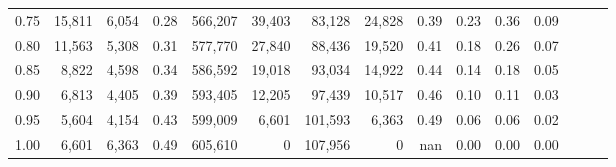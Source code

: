 \begin{tabular}{rrrrrrrrrrrrrrr}
0.75 &  15,811 &  6,054 &  0.28 &  566,207 &   39,403 &   83,128 &   24,828 &  0.39 &  0.23 &  0.36 &      0.09 \\
0.80 &  11,563 &  5,308 &  0.31 &  577,770 &   27,840 &   88,436 &   19,520 &  0.41 &  0.18 &  0.26 &      0.07 \\
0.85 &   8,822 &  4,598 &  0.34 &  586,592 &   19,018 &   93,034 &   14,922 &  0.44 &  0.14 &  0.18 &      0.05 \\
0.90 &   6,813 &  4,405 &  0.39 &  593,405 &   12,205 &   97,439 &   10,517 &  0.46 &  0.10 &  0.11 &      0.03 \\
0.95 &   5,604 &  4,154 &  0.43 &  599,009 &    6,601 &  101,593 &    6,363 &  0.49 &  0.06 &  0.06 &      0.02 \\
1.00 &   6,601 &  6,363 &  0.49 &  605,610 &        0 &  107,956 &        0 &   nan &  0.00 &  0.00 &      0.00 \\
\bottomrule
\end{tabular}
